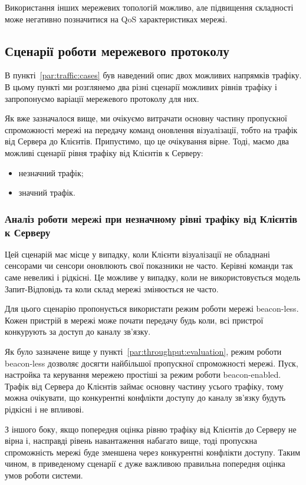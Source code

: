 \documentclass[a4paper,ukrainian,utf8,nocolumnsxix,floatsection,equationsection]{eskdtext}
\renewcommand\paragraph{\subsubsection}
\newcommand{\blm}[0]{beacon-less\xspace}
\newcommand{\bem}[0]{beacon-enabled\xspace}
\begin{document}
Використання інших мережевих топологій можливо, але підвищення складності може негативно позначитися на QoS характеристиках мережі.

\subsection{Сценарії роботи мережевого протоколу}
\label{sub:network:protocol:scenarios}

В пункті~\ref{par:traffic:cases} був наведений опис двох можливих напрямків трафіку. В цьому пункті ми розглянемо два різні сценарії можливих рівнів трафіку і запропонуємо варіації мережевого протоколу для них.

Як вже зазначалося вище, ми очікуємо витрачати основну частину пропускної спроможності мережі на передачу команд оновлення візуалізації, тобто на трафік від Сервера до Клієнтів. Припустимо, що це очікування вірне. Тоді, маємо два можливі сценарії рівня трафіку від Клієнтів к Серверу:
\begin{itemize}
	\item незначний трафік;
	\item значний трафік.
\end{itemize}


\paragraph{Аналіз роботи мережі при незначному рівні трафіку від Клієнтів к Серверу}
\label{par:low:ntht}

Цей сценарій має місце у випадку, коли Клієнти візуалізації не обладнані сенсорами чи сенсори оновлюють свої показники не часто. Керівні команди так саме невеликі і рідкісні. Це можливе у випадку, коли не використовується модель Запит-Відповідь та коли склад мережі змінюється не часто.

Для цього сценарію пропонується використати режим роботи мережі \blm. Кожен пристрій в мережі може почати передачу будь коли, всі пристрої конкурують за доступ до каналу зв'язку. 

Як було зазначене вище у пункті~\ref{par:throughput:evaluation}, режим роботи \blm дозволяє досягти найбільшої пропускної спроможності мережі. Пуск, настройка та керування мережею простіші за режим роботи \bem. Трафік від Сервера до Клієнтів займає основну частину усього трафіку, тому можна очікувати, що конкурентні конфлікти доступу до каналу зв'язку будуть рідкісні і не впливові.

З іншого боку, якщо попередня оцінка рівню трафіку від Клієнтів до Серверу не вірна і, насправді рівень навантаження набагато вище, тоді пропускна спроможність мережі буде зменшена через конкурентні конфлікти доступу. Таким чином, в приведеному сценарії є дуже важливою правильна попередня оцінка умов роботи системи.
\end{document}
